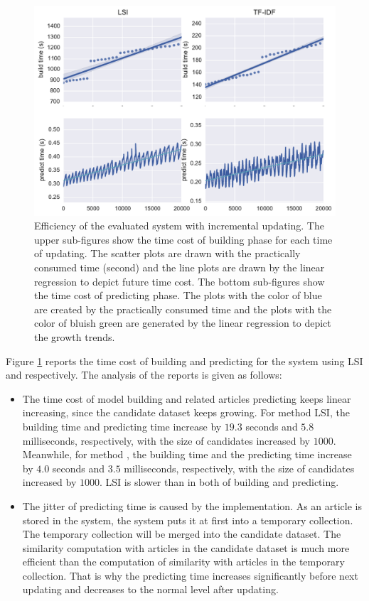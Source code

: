 \begin{figure}[!htb]
    \centering
    \includegraphics[width=\textwidth]{fig/runtime_inc}
    \caption[Efficiency of the evaluated system with incremental updating]{Efficiency of the evaluated system with incremental updating. The upper sub-figures show the time cost of building phase for each time of updating. The scatter plots are drawn with the practically consumed time (second) and the line plots are drawn by the linear regression to depict future time cost. The bottom sub-figures show the time cost of predicting phase. The plots with the color of blue are created by the practically consumed time and the plots with the color of bluish green are generated by the linear regression to depict the growth trends. }
    \label{fig:runtime_inc}
\end{figure}

Figure \ref{fig:runtime_inc} reports the time cost of building and predicting for the system using LSI and \tfidf{} respectively. The analysis of the reports is given as follows:

\begin{itemize}
    \item The time cost of model building and related articles predicting keeps linear increasing, since the candidate dataset keeps growing. For method LSI, the building time and predicting time increase by $19.3$ seconds and $5.8$ milliseconds, respectively, with the size of candidates increased by $1000$. Meanwhile, for method \tfidf{}, the building time and the predicting time increase by $4.0$ seconds and $3.5$ milliseconds, respectively, with the size of candidates increased by $1000$. LSI is slower than \tfidf{} in both of building and predicting. 
    \item The jitter of predicting time is caused by the implementation. As an article is stored in the system, the system puts it at first into a temporary collection. The temporary collection will be merged into the candidate dataset. The similarity computation with articles in the candidate dataset is much more efficient than the computation of similarity with articles in the temporary collection. That is why the predicting time increases significantly before next updating and decreases to the normal level after updating. 
    
\end{itemize}

